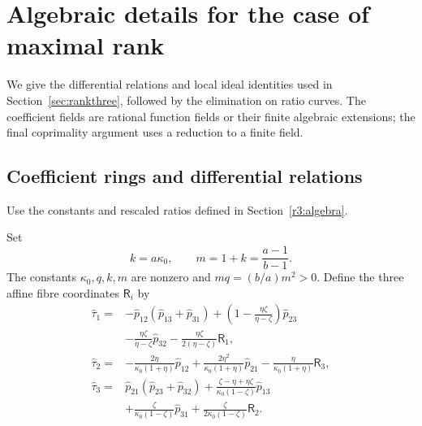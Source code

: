 \documentclass[11pt,a4paper]{article}
\numberwithin{equation}{section}
\theoremstyle{plain}
\theoremstyle{definition}
\theoremstyle{remark}
\begin{document}
\section{Algebraic details for the case of maximal rank}\label{appr3:main}

We give the differential relations and local ideal identities used
in Section~\ref{sec:rankthree}, followed by the elimination on ratio
curves. The coefficient fields are rational function fields or their
finite algebraic extensions; the final coprimality argument uses
a reduction to a finite field.

\subsection{Coefficient rings and differential relations}
\label{appr3:sources}

Use the constants and rescaled ratios defined in Section~\ref{r3:algebra}.

Set
\[
 k=a\kappa_0,\qquad m=1+k=\frac{a-1}{b-1}.
\]
The constants $\kappa_0 ,q,k,m$ are nonzero and $mq=(b/a)m^2>0$. Define the
three affine fibre coordinates $\mathsf R_i$ by
\begin{equation}\label{r3:RRreconstruction}
\begin{aligned}
\widehat\tau_1={}&-\widehat p_{12}(\widehat p_{13}+\widehat p_{31})
 +\left(1-\frac{\eta \zeta }{\eta -\zeta }\right)\widehat p_{23}\\
 &-\frac{\eta \zeta }{\eta -\zeta }\widehat p_{32}-\frac{\eta \zeta }{2(\eta -\zeta )}\mathsf R_1,\\
\widehat\tau_2={}&-\frac{2\eta }{\kappa_0 (1+\eta )}\widehat p_{12}
 +\frac{2\eta ^2}{\kappa_0 (1+\eta )}\widehat p_{21}-\frac{\eta }{\kappa_0 (1+\eta )}\mathsf R_3,\\
\widehat\tau_3={}&\widehat p_{21}(\widehat p_{23}+\widehat p_{32})
 +\frac{\zeta -\eta +\eta \zeta }{\kappa_0 (1-\zeta )}\widehat p_{13}\\
 &+\frac{\zeta }{\kappa_0 (1-\zeta )}\widehat p_{31}+\frac{\zeta }{2\kappa_0 (1-\zeta )}\mathsf R_2.
\end{aligned}
\end{equation}
\end{document}

